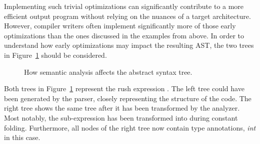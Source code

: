 Implementing such trivial optimizations can significantly contribute to a more efficient output program without relying on the nuances of a target architecture.
However, compiler writers often implement significantly more of those early optimizations than the ones discussed in the examples from above.
In order to understand how early optimizations may impact the resulting AST,
the two trees in Figure~\ref{fig:analysis_tree_conv} should be considered.

\noindent
\begin{figure}[h]
	\centering
	\caption{How semantic analysis affects the abstract syntax tree.}\label{fig:analysis_tree_conv}
\end{figure}

Both trees in Figure~\ref{fig:analysis_tree_conv} represent the rush expression .
The left tree could have been generated by the parser, closely representing the structure of the code.
The right tree shows the same tree after it has been transformed by the analyzer.
Most notably, the sub-expression  has been transformed into  during constant folding.
Furthermore, all nodes of the right tree now contain type annotations, \emph{int} in this case.
